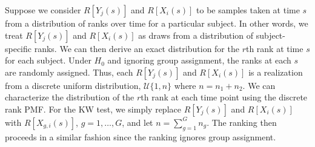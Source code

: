 \documentclass[12pt]{article}
\theoremstyle{plain}
\begin{document}

Suppose we consider $R[Y_j(s)]$ and $R[X_i(s)]$ to be samples taken at time $s$ from a distribution of ranks over time for a particular subject. In other words, we treat $R[Y_j(s)]$ and $R[X_i(s)]$ as draws from a distribution of subject-specific ranks. We can then derive an exact distribution for the $r$th rank at time $s$ for each subject. Under $H_0$ and ignoring group assignment, the ranks at each $s$ are randomly assigned. Thus, each $R[Y_j(s)]$ and $R[X_i(s)]$ is a realization from a discrete uniform distribution, $\mathcal{U}\{1,n\}$ where $n = n_1 + n_2$. We can characterize the distribution of the $r$th rank at each time point using the discrete rank PMF. For the KW test, we simply replace $R[Y_j(s)]$ and $R[X_i(s)]$ with $R[X_{g,i}(s)]$, $g = 1, \ldots, G$, and let $n = \sum_{g=1}^G n_g$. The ranking then proceeds in a similar fashion since the ranking ignores group assignment.
\end{document}
